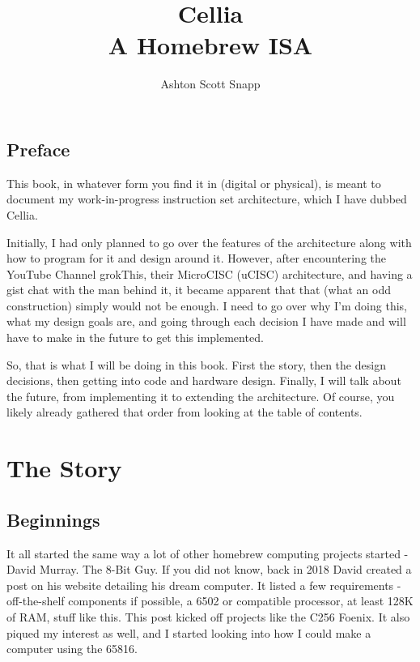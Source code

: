 \documentclass[letterpaper,12pt]{book}
\begin{document}
\title{\textbf{Cellia}\\A Homebrew ISA}
\author{Ashton Scott Snapp}

\frontmatter

\maketitle

\tableofcontents

\chapter*{Preface}

This book, in whatever form you find it in (digital or physical), is meant to document my work-in-progress instruction set architecture, which I have dubbed Cellia.

Initially, I had only planned to go over the features of the architecture along with how to program for it and design around it. However, after encountering the YouTube Channel grokThis, their MicroCISC (uCISC) architecture, and having a gist chat with the man behind it, it became apparent that that (what an odd construction) simply would not be enough. I need to go over why I'm doing this, what my design goals are, and going through each decision I have made and will have to make in the future to get this implemented.

So, that is what I will be doing in this book. First the story, then the design decisions, then getting into code and hardware design. Finally, I will talk about the future, from implementing it to extending the architecture. Of course, you likely already gathered that order from looking at the table of contents.

\mainmatter

\part{The Story}

\chapter{Beginnings}

It all started the same way a lot of other homebrew computing projects started - David Murray. The 8-Bit Guy. If you did not know, back in 2018 David created a post on his website detailing his dream computer. It listed a few requirements - off-the-shelf components if possible, a 6502 or compatible processor, at least 128K of RAM, stuff like this. This post kicked off projects like the C256 Foenix. It also piqued my interest as well, and I started looking into how I could make a computer using the 65816.
\end{document}
